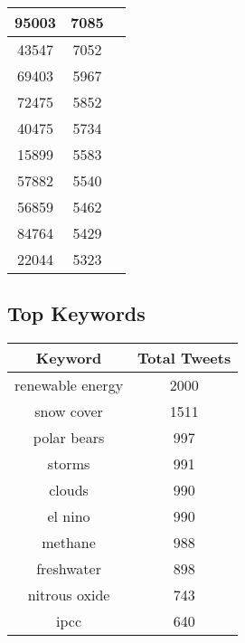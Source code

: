 \documentclass{article}\usepackage[T1]{fontenc}
\begin{document}
\begin{tabular}{|c|c|c|}
 \hline
95003 & 7085\\ 
 \hline
43547 & 7052\\ 
 \hline
69403 & 5967\\ 
 \hline
72475 & 5852\\ 
 \hline
40475 & 5734\\ 
 \hline
15899 & 5583\\ 
 \hline
57882 & 5540\\ 
 \hline
56859 & 5462\\ 
 \hline
84764 & 5429\\ 
 \hline
22044 & 5323\\ 
 \hline
\end{tabular}\subsection*{Top Keywords}\begin{tabular}{|c|c|}         \hline         Keyword & Total Tweets \\ 
 \hline
renewable energy & 2000\\ 
 \hline
snow cover & 1511\\ 
 \hline
polar bears & 997\\ 
 \hline
storms & 991\\ 
 \hline
clouds & 990\\ 
 \hline
el nino & 990\\ 
 \hline
methane & 988\\ 
 \hline
freshwater & 898\\ 
 \hline
nitrous oxide & 743\\ 
 \hline
ipcc & 640\\ 
 \hline
\end{tabular}
\end{document}
